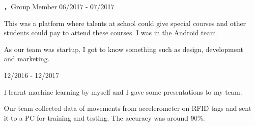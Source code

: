 \begin{cventries}
\cvexperience
{，Group Member}
{06/2017 - 07/2017}
{
    \begin{cvitems}
    \item {This was a platform where talents at school could give special courses and other students could pay to attend these courses. I was in the Android team.}
    \item {As our team was startup, I got to know something such as design, development and marketing.}
    \end{cvitems}
}

 \cvexperience
 {}
 {12/2016 - 12/2017}
 {
     \begin{cvitems}
     \item {I learnt machine learning by myself and I gave some presentations to my team.}
     \item {Our team collected data of movements from accelerometer on RFID tags and sent it to a PC for training and testing. The accuracy was around 90\%.}
     \end{cvitems}
 }
\end{cventries}